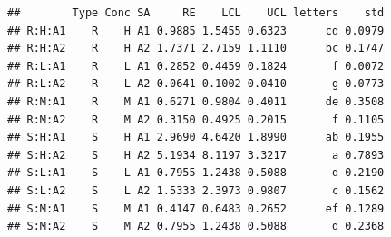 \documentclass[
]{article}
\newenvironment{Shaded}{\begin{snugshade}}{\end{snugshade}}
\newcommand{\AttributeTok}[1]{\textcolor[rgb]{0.13,0.29,0.53}{#1}}
\newcommand{\CommentTok}[1]{\textcolor[rgb]{0.56,0.35,0.01}{\textit{#1}}}
\newcommand{\DecValTok}[1]{\textcolor[rgb]{0.00,0.00,0.81}{#1}}
\newcommand{\FunctionTok}[1]{\textcolor[rgb]{0.13,0.29,0.53}{\textbf{#1}}}
\newcommand{\NormalTok}[1]{#1}
\newcommand{\OtherTok}[1]{\textcolor[rgb]{0.56,0.35,0.01}{#1}}
\newcommand{\SpecialCharTok}[1]{\textcolor[rgb]{0.81,0.36,0.00}{\textbf{#1}}}
\begin{document}
\begin{Shaded}
\end{Shaded}

\begin{verbatim}
##        Type Conc SA     RE    LCL    UCL letters    std
## R:H:A1    R    H A1 0.9885 1.5455 0.6323      cd 0.0979
## R:H:A2    R    H A2 1.7371 2.7159 1.1110      bc 0.1747
## R:L:A1    R    L A1 0.2852 0.4459 0.1824       f 0.0072
## R:L:A2    R    L A2 0.0641 0.1002 0.0410       g 0.0773
## R:M:A1    R    M A1 0.6271 0.9804 0.4011      de 0.3508
## R:M:A2    R    M A2 0.3150 0.4925 0.2015       f 0.1105
## S:H:A1    S    H A1 2.9690 4.6420 1.8990      ab 0.1955
## S:H:A2    S    H A2 5.1934 8.1197 3.3217       a 0.7893
## S:L:A1    S    L A1 0.7955 1.2438 0.5088       d 0.2190
## S:L:A2    S    L A2 1.5333 2.3973 0.9807       c 0.1562
## S:M:A1    S    M A1 0.4147 0.6483 0.2652      ef 0.1289
## S:M:A2    S    M A2 0.7955 1.2438 0.5088       d 0.2368
\end{verbatim}
\end{document}
